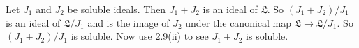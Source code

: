 Let $J_1$ and $J_2$ be soluble ideals. Then $J_1 + J_2$ is an ideal
of $\mathfrak{L}$. So $(J_1 + J_2)/J_1$ is an ideal of $\mathfrak{L}/J_1$ and is the
image of $J_2$ under the canonical map $\mathfrak{L}\to \mathfrak{L}/J_1$. So
$(J_1+J_2)/J_1$ is soluble. Now use 2.9(ii) to see $J_1 + J_2$ is soluble.
